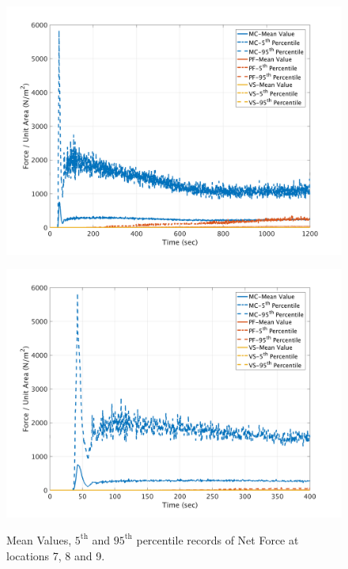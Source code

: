 \documentclass[a4paper,10pt]{article}
\begin{document}
\begin{figure}[H]
	\begin{minipage}[b]{0.5\linewidth}
	\centering
    \includegraphics[width=1\textwidth]{NetFAll/NetF9All.png}     
        \label{fig:NF9}
	\end{minipage}
	\begin{minipage}[b]{0.5\linewidth}
	\centering
    \includegraphics[width=1\textwidth]{NetFAll/NetF9All_z.png}
        \label{fig:NF9zoom}
	\end{minipage}
	
	\caption{Mean Values, $5^{\mathrm{th}}$ and $95^{\mathrm{th}}$ percentile records of Net Force at locations 7, 8 and 9.}\label{fig:NF789}	
\end{figure}
\end{document}
